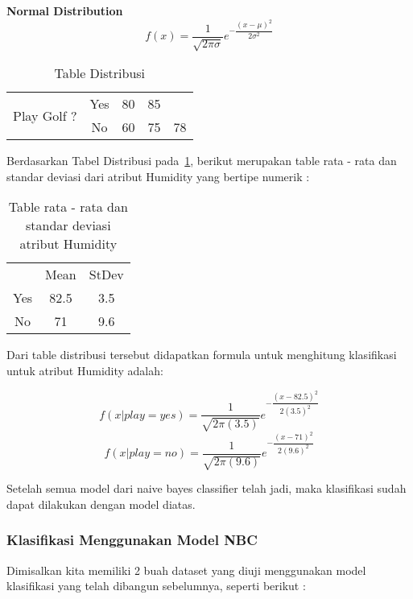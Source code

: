 		\textbf{Normal Distribution}
		\begin{equation}
			f(x) = \dfrac{1}{\sqrt{2\pi\sigma}}e^{-\dfrac{(x-\mu)^2}{2\sigma^2}}
		\end{equation}
		
		\begin{table}[h]
		\centering
		\caption{Table Distribusi}
		\label{tab:Table Distribusi}
		\begin{tabular}{|c|c|c|c|c|}
		\toprule
		\multirow{2}{*}{Play Golf ?} & Yes & 80 & 85 & \\
		 & No & 60 & 75 & 78 \\
		\bottomrule
		\end{tabular}
		\end{table}
		
		Berdasarkan Tabel Distribusi pada~\ref{tab:Table Distribusi}, berikut merupakan table rata - rata dan standar deviasi dari atribut Humidity yang bertipe numerik : 
		
		\begin{table}[ht]
		\centering
		\caption{Table rata - rata dan standar deviasi atribut Humidity}
		\begin{tabular}{|c|c|c|}
		\toprule
		 & Mean & StDev \\
		Yes & 82.5 & 3.5 \\
		No & 71 & 9.6 \\
		\bottomrule
		\end{tabular}
		\end{table}
		
		Dari table distribusi tersebut didapatkan formula untuk menghitung klasifikasi untuk atribut Humidity adalah:
		
		\begin{equation}
			f(x|play=yes) = \dfrac{1}{\sqrt{2\pi(3.5)}}e^{-\dfrac{(x-82.5)^2}{2(3.5)^2}}
		\end{equation}
		\begin{equation}
			f(x|play=no) = \dfrac{1}{\sqrt{2\pi(9.6)}}e^{-\dfrac{(x-71)^2}{2(9.6)^2}} 
		\end{equation}
		
		Setelah semua model dari naive bayes classifier telah jadi, maka klasifikasi sudah dapat dilakukan dengan model diatas.

\subsubsection{Klasifikasi Menggunakan Model NBC}
		Dimisalkan kita memiliki 2 buah dataset yang diuji menggunakan model klasifikasi yang telah dibangun sebelumnya, seperti berikut :
		
